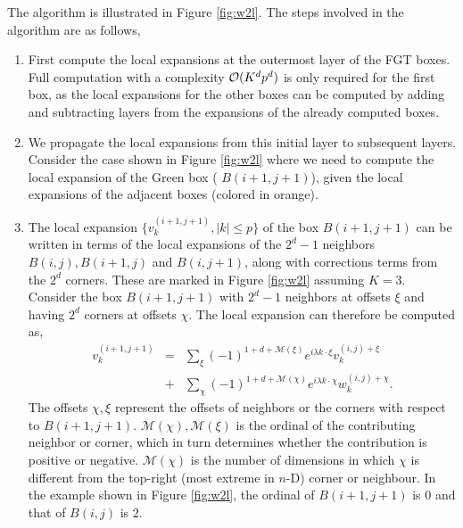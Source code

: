The algorithm is illustrated in Figure \ref{fig:w2l}. The steps involved in the
algorithm are as follows, 
\begin{enumerate}    
  \item First compute the local expansions at the outermost layer of the FGT
    boxes. Full computation with a complexity $\mathcal{O}(K^d p^d)$ is only required for the first box, as
    the local expansions for the other boxes can be computed by adding and
    subtracting layers from the expansions of the already computed boxes. 
  
  \item We propagate the local expansions from this initial layer to subsequent
    layers. Consider the case shown in Figure \ref{fig:w2l} where we need to
    compute the local expansion of the Green box ( $B(i+1,j+1)$), given the
    local expansions of the adjacent boxes (colored in orange).  
  
  \item The local expansion $\{v_k^{(i+1, j+1)}, |k| \leq p\}$ of the box $B(i+1, j+1)$ can be written in terms of the
    local expansions of the $2^d -1$ neighbors $B(i,j), B(i+1,j)$ and
    $B(i,j+1)$, along with corrections terms from the $2^d$ corners.
    These are marked in Figure \ref{fig:w2l} assuming $K=3$. Consider the box $B(i+1, j+1)$ with $2^d -1$ neighbors at offsets $\xi$ and having $2^d$ corners at offsets $\chi$. The local expansion can therefore be computed as,
    \begin{eqnarray} 
    v_k^{(i+1,j+1)} &=& \sum_{\xi} (-1)^{1 + d + \mathcal{M}(\xi)} e^{i\lambda k\cdot\xi} v_k^{(i,j)+\xi} \nonumber\\
    & +& \sum_{\chi} (-1)^{1 + d + \mathcal{M}(\chi)} e^{i\lambda k\cdot \chi} w_k^{(i,j)+\chi}. \label{eqn:sweep}
    \end{eqnarray}
    The offsets $\chi, \xi$ represent the offsets of neighbors or the corners with respect to $B(i+1, j+1)$. $\mathcal{M}(\chi), \mathcal{M}(\xi)$ is the ordinal of the contributing neighbor or corner, which in turn determines whether the contribution is positive or negative. $\mathcal{M}(\chi)$ is the number of dimensions in which $\chi$ is different from the top-right (most extreme in $n$-D) corner or neighbour. In the example shown in Figure \ref{fig:w2l}, the ordinal of $B(i+1, j+1)$ is $0$ and that of $B(i, j)$ is $2$. 


\end{enumerate}
